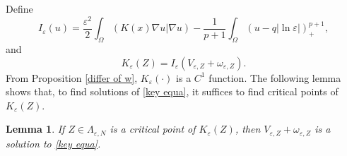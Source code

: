 \documentclass[12pt,reqno]{amsart}
\numberwithin{equation}{section}
\newtheorem{lemma}[theorem]{Lemma}
\theoremstyle{definition}
\theoremstyle{remark}
\begin{document}
Define
\begin{equation}\label{functional I}
I_\varepsilon(u)=\frac{\varepsilon^2}{2}\int_{\Omega}\left( K(x)\nabla u|\nabla u\right)-\frac{1}{p+1}\int_{\Omega}\left (u-q|\ln\varepsilon|\right )^{p+1}_+,%
\end{equation}
and
\begin{equation*}
K_\varepsilon(Z)=I_\varepsilon(V_{\varepsilon,Z}+\omega_{\varepsilon,Z}).
\end{equation*}
From Proposition \ref{differ of w}, $ K_\varepsilon(\cdot) $ is a $ C^1 $ function.
The following lemma shows that, to find solutions of \eqref{key equa}, it suffices to find critical points of  $ K_\varepsilon(Z) $.
\begin{lemma}\label{choice of Z}
If $ Z\in \Lambda_{\varepsilon, N}$ is a critical point of $ K_\varepsilon(Z) $, then
$ V_{\varepsilon,Z}+\omega_{\varepsilon,Z} $  is a solution to \eqref{key equa}.
\end{lemma}
\end{document}
